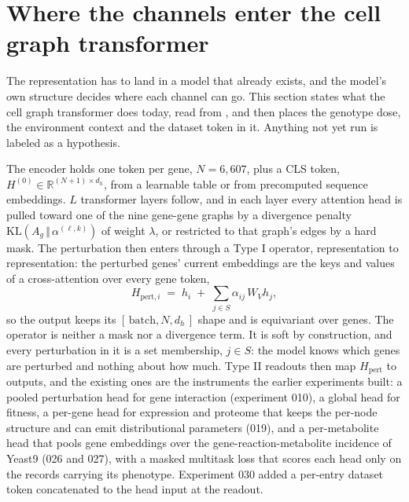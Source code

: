 
\section{Where the channels enter the cell graph transformer}
\label{sec:model}

The representation has to land in a model that already exists, and the model's own structure
decides where each channel can go. This section states what the cell graph transformer does
today, read from , and then
places the genotype dose, the environment context and the dataset token in it. Anything not
yet run is labeled as a hypothesis.

The encoder holds one token per gene, $N = 6{,}607$, plus a CLS token, $H^{(0)} \in
\mathbb{R}^{(N+1) \times d_h}$, from a learnable table or from precomputed sequence
embeddings. $L$ transformer layers follow, and in each layer every attention head is pulled
toward one of the nine gene-gene graphs by a divergence penalty
$\mathrm{KL}(A_g \,\Vert\, \alpha^{(\ell,k)})$ of weight $\lambda$, or restricted to that
graph's edges by a hard mask. The perturbation then enters through a Type I operator,
representation to representation: the perturbed genes' current embeddings are the keys and
values of a cross-attention over every gene token,
\[
  H_{\mathrm{pert},i} \;=\; h_i \;+\; \sum_{j \in S} \alpha_{ij}\, W_V h_j ,
\]
so the output keeps its $[\,\text{batch}, N, d_h\,]$ shape and is equivariant over genes.
The operator is neither a mask nor a divergence term. It is soft by construction, and every
perturbation in it is a set membership, $j \in S$: the model knows which genes are perturbed
and nothing about how much. Type II readouts then map $H_{\mathrm{pert}}$ to outputs, and
the existing ones are the instruments the earlier experiments built: a pooled perturbation
head for gene interaction (experiment 010), a global head for fitness, a per-gene head for
expression and proteome that keeps the per-node structure and can emit distributional
parameters (019), and a per-metabolite head that pools gene embeddings over the
gene-reaction-metabolite incidence of Yeast9 (026 and 027), with a masked multitask loss
that scores each head only on the records carrying its phenotype. Experiment 030 added a
per-entry dataset token concatenated to the head input at the readout.

